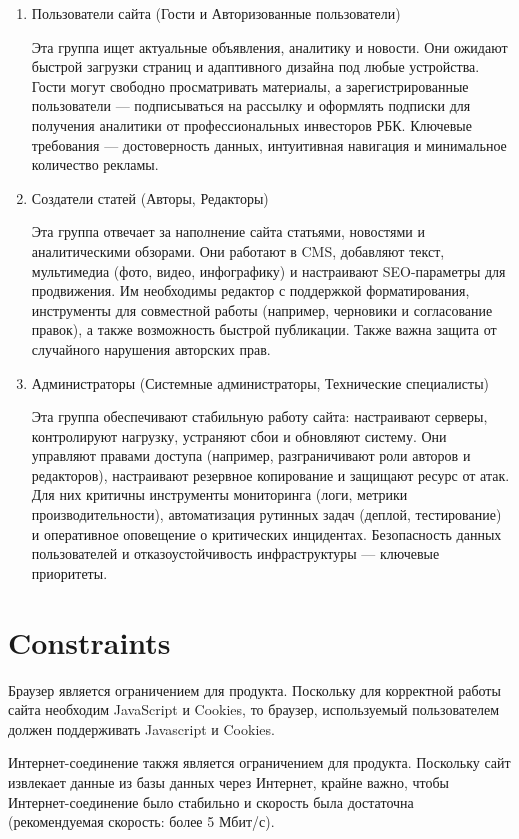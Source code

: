 \documentclass{scrreprt}
\begin{document}
\begin{enumerate}
\item Пользователи сайта (Гости и Авторизованные пользователи)

Эта группа ищет актуальные объявления, аналитику и новости. Они ожидают быстрой загрузки страниц и адаптивного дизайна под любые устройства. Гости могут свободно просматривать материалы, а зарегистрированные пользователи — подписываться на рассылку и оформлять подписки для получения аналитики от профессиональных инвесторов РБК. Ключевые требования — достоверность данных, интуитивная навигация и минимальное количество рекламы.

\item Создатели статей (Авторы, Редакторы)

Эта группа отвечает за наполнение сайта статьями, новостями и аналитическими обзорами. Они работают в CMS, добавляют текст, мультимедиа (фото, видео, инфографику) и настраивают SEO-параметры для продвижения. Им необходимы редактор с поддержкой форматирования, инструменты для совместной работы (например, черновики и согласование правок), а также возможность быстрой публикации. Также важна 	 защита от случайного нарушения авторских прав.

\item Администраторы (Системные администраторы, Технические специалисты)

Эта группа обеспечивают стабильную работу сайта: настраивают серверы, контролируют нагрузку, устраняют сбои и обновляют систему. Они управляют правами доступа (например, разграничивают роли авторов и редакторов), настраивают резервное копирование и защищают ресурс от атак. Для них критичны инструменты мониторинга (логи, метрики производительности), автоматизация рутинных задач (деплой, тестирование) и оперативное оповещение о критических инцидентах. Безопасность данных пользователей и отказоустойчивость инфраструктуры — ключевые приоритеты.

\end{enumerate}

\section{Constraints}

Браузер является ограничением для продукта. Поскольку для корректной работы сайта необходим JavaScript и Cookies, то браузер, используемый пользователем должен поддерживать Javascript и Cookies.

Интернет-соединение такжя является ограничением для продукта. Поскольку сайт извлекает данные из базы данных через Интернет, крайне важно, чтобы Интернет-соединение было стабильно и скорость была достаточна (рекомендуемая скорость: более 5 Мбит/с).
\end{document}
